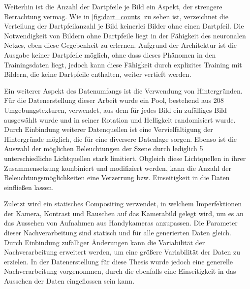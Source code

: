 
Weiterhin ist die Anzahl der Dartpfeile je Bild ein Aspekt, der strengere Betrachtung vermag. Wie in \autoref{fig:dart_counts} zu sehen ist, verzeichnet die Verteilung der Dartpfeilanzahl je Bild keinerlei Bilder ohne einen Dartpfeil. Die Notwendigkeit von Bildern ohne Dartpfeile liegt in der Fähigkeit des neuronalen Netzes, eben diese Gegebenheit zu erlernen. Aufgrund der Architektur ist die Ausgabe keiner Dartpfeile möglich, ohne dass dieses Phänomen in den Trainingsdaten liegt, jedoch kann diese Fähigkeit durch explizites Training mit Bildern, die keine Dartpfeile enthalten, weiter vertieft werden.


Ein weiterer Aspekt des Datenumfangs ist die Verwendung von Hintergründen. Für die Datenerstellung dieser Arbeit wurde ein Pool, bestehend aus 208 Umgebungstexturen, verwendet, aus dem für jedes Bild ein zufälliges Bild ausgewählt wurde und in seiner Rotation und Helligkeit randomisiert wurde. Durch Einbindung weiterer Datenquellen ist eine Vervielfältigung der Hintergründe möglich, die für eine diversere Datenlage sorgen. Ebenso ist die Auswahl der möglichen Beleuchtungen der Szene durch lediglich 5 unterschiedliche Lichtquellen stark limitiert. Obgleich diese Lichtquellen in ihrer Zusammensetzung kombiniert und modifiziert werden, kann die Anzahl der Beleuchtungsmöglichkeiten eine Verzerrung bzw. Einseitigkeit in die Daten einfließen lassen.


Zuletzt wird ein statisches Compositing verwendet, in welchem Imperfektionen der Kamera, Kontrast und Rauschen auf das Kamerabild gelegt wird, um es an das Aussehen von Aufnahmen aus Handykameras anzupassen. Die Parameter dieser Nachverarbeitung sind statisch und für alle generierten Daten gleich. Durch Einbindung zufälliger Änderungen kann die Variabilität der Nachverarbeitung erweitert werden, um eine größere Variabilität der Daten zu erzielen. In der Datenerstellung für diese Thesis wurde jedoch eine generelle Nachverarbeitung vorgenommen, durch die ebenfalls eine Einseitigkeit in das Aussehen der Daten eingeflossen sein kann.

